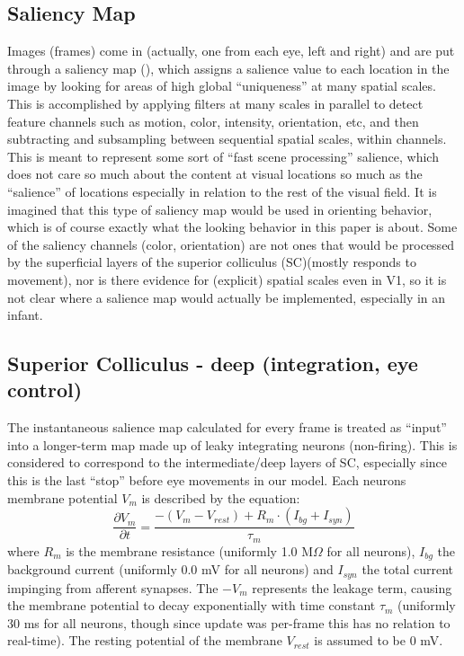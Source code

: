 \documentclass[conference]{IEEEtran}
\begin{document}
\subsection{Saliency Map}
Images (frames) come in (actually, one from each eye, left and right)
and are put through a saliency map (\cite{itti_etal_1998}), which
assigns a salience value to each location in the image by looking for
areas of high global ``uniqueness'' at many spatial scales. This is
accomplished by applying filters at many scales in parallel to detect
feature channels such as motion, color, intensity, orientation, etc,
and then subtracting and subsampling between sequential spatial
scales, within channels. This is meant to represent some sort of
``fast scene processing'' salience, which does not care so much about
the content at visual locations so much as the ``salience'' of
locations especially in relation to the rest of the visual field. It
is imagined that this type of saliency map would be used in orienting
behavior, which is of course exactly what the looking behavior in this
paper is about. Some of the saliency channels (color, orientation) are
not ones that would be processed by the superficial layers of the
superior colliculus (SC)(mostly responds to movement), nor is there
evidence for (explicit) spatial scales even in V1, so it is not clear
where a salience map would actually be implemented, especially in an
infant.

\subsection{Superior Colliculus - deep (integration, eye control)}
The instantaneous salience map calculated for every frame is treated
as ``input'' into a longer-term map made up of leaky integrating
neurons (non-firing). This is considered to correspond to the
intermediate/deep layers of SC, especially since this is the last
``stop'' before eye movements in our model. Each neurons membrane
potential $V_m$ is described by the equation:
\begin{equation}
\frac{\partial V_m}{\partial t} = \frac{-(V_m - V_{rest}) + R_m \cdot
  (I_{bg} + I_{syn})}{\tau_m}
\end{equation}
where $R_m$ is the membrane resistance (uniformly 1.0 M$\Omega$ for
all neurons), $I_{bg}$ the background current (uniformly 0.0 mV for
all neurons) and $I_{syn}$ the total current impinging from afferent
synapses. The $-V_m$ represents the leakage term, causing the membrane
potential to decay exponentially with time constant $\tau_m$
(uniformly 30 ms for all neurons, though since update was per-frame
this has no relation to real-time). The resting potential of the
membrane $V_{rest}$ is assumed to be 0 mV.
\end{document}
